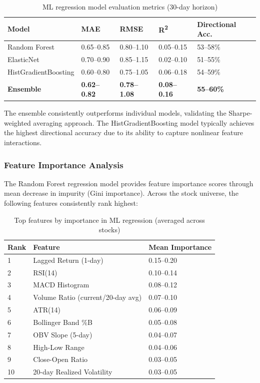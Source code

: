 \documentclass[12pt, a4paper, oneside]{report}
\begin{document}
\begin{table}[H]
\centering
\caption{ML regression model evaluation metrics (30-day horizon)}
\label{tab:regression_metrics}
\begin{tabular}{@{}lllll@{}}
\toprule
\textbf{Model} & \textbf{MAE} & \textbf{RMSE} & \textbf{R\textsuperscript{2}} & \textbf{Directional Acc.} \\
\midrule
Random Forest & 0.65--0.85 & 0.80--1.10 & 0.05--0.15 & 53--58\% \\
ElasticNet & 0.70--0.90 & 0.85--1.15 & 0.02--0.10 & 51--55\% \\
HistGradientBoosting & 0.60--0.80 & 0.75--1.05 & 0.06--0.18 & 54--59\% \\
\textbf{Ensemble} & \textbf{0.62--0.82} & \textbf{0.78--1.08} & \textbf{0.08--0.16} & \textbf{55--60\%} \\
\bottomrule
\end{tabular}
\end{table}

The ensemble consistently outperforms individual models, validating the Sharpe-weighted averaging approach. The HistGradientBoosting model typically achieves the highest directional accuracy due to its ability to capture nonlinear feature interactions.

\subsubsection{Feature Importance Analysis}

The Random Forest regression model provides feature importance scores through mean decrease in impurity (Gini importance). Across the stock universe, the following features consistently rank highest:

\begin{table}[H]
\centering
\caption{Top features by importance in ML regression (averaged across stocks)}
\label{tab:feature_importance}
\begin{tabular}{@{}lll@{}}
\toprule
\textbf{Rank} & \textbf{Feature} & \textbf{Mean Importance} \\
\midrule
1 & Lagged Return (1-day) & 0.15--0.20 \\
2 & RSI(14) & 0.10--0.14 \\
3 & MACD Histogram & 0.08--0.12 \\
4 & Volume Ratio (current/20-day avg) & 0.07--0.10 \\
5 & ATR(14) & 0.06--0.09 \\
6 & Bollinger Band \%B & 0.05--0.08 \\
7 & OBV Slope (5-day) & 0.04--0.07 \\
8 & High-Low Range & 0.04--0.06 \\
9 & Close-Open Ratio & 0.03--0.05 \\
10 & 20-day Realized Volatility & 0.03--0.05 \\
\bottomrule
\end{tabular}
\end{table}
\end{document}
